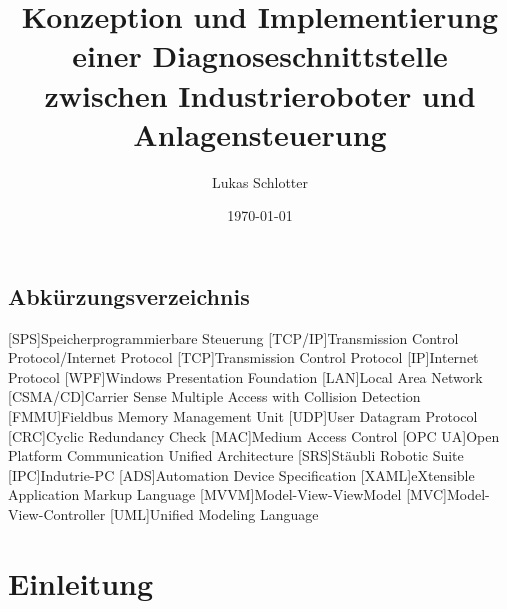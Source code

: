 \documentclass[ a4paper,
                oneside,
                toc=bibliography,
                toc=listof
                ]{scrbook}
\author{Lukas Schlotter}
\title{Konzeption und Implementierung einer Diagnoseschnittstelle zwischen Industrieroboter und Anlagensteuerung}
\date{\today}
\begin{document}
 
    \frontmatter
    \makeISWtitle
    
    \cleardoublepage
	\setcounter{page}{1} %
    \declarationOfOriginality

    
    
    \cleardoublepage
    \tableofcontents
    
  
    \section*{Abkürzungsverzeichnis}
    \begin{acronym}[CSMA/CD]
    	[SPS]{Speicherprogrammierbare Steuerung}
    	[TCP/IP]{Transmission Control Protocol/Internet Protocol}
    	[TCP]{Transmission Control Protocol}
    	[IP]{Internet Protocol}
    	[WPF]{Windows Presentation Foundation}
    	[LAN]{Local Area Network}
    	[CSMA/CD]{Carrier Sense Multiple Access with Collision Detection}
    	[FMMU]{Fieldbus Memory Management Unit}
    	[UDP]{User Datagram Protocol}
    	[CRC]{Cyclic Redundancy Check}
    	[MAC]{Medium Access Control}
    	[OPC UA]{Open Platform Communication Unified Architecture}
    	[SRS]{Stäubli Robotic Suite}
    	[IPC]{Indutrie-PC}
    	[ADS]{Automation Device Specification}
    	[XAML]{eXtensible Application Markup Language}
    	[MVVM]{Model-View-ViewModel}
    	[MVC]{Model-View-Controller}
    	[UML]{Unified Modeling Language}
    	
    \end{acronym}

    \mainmatter
    
    \chapter{Einleitung}
\end{document}
